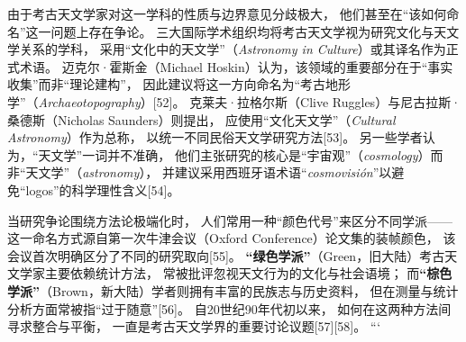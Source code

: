 \bigskip
由于考古天文学家对这一学科的性质与边界意见分歧极大，  
他们甚至在“该如何命名”这一问题上存在争论。  
三大国际学术组织均将考古天文学视为研究文化与天文学关系的学科，  
采用“文化中的天文学”（\textit{Astronomy in Culture}）或其译名作为正式术语。  
迈克尔·霍斯金（Michael Hoskin）认为，该领域的重要部分在于“事实收集”而非“理论建构”，  
因此建议将这一方向命名为“考古地形学”（\textit{Archaeotopography}）[52]。  
克莱夫·拉格尔斯（Clive Ruggles）与尼古拉斯·桑德斯（Nicholas Saunders）则提出，  
应使用“文化天文学”（\textit{Cultural Astronomy}）作为总称，  
以统一不同民俗天文学研究方法[53]。  
另一些学者认为，“天文学”一词并不准确，  
他们主张研究的核心是“宇宙观”（\textit{cosmology}）而非“天文学”（\textit{astronomy}），  
并建议采用西班牙语术语“\textit{cosmovisión}”以避免“logos”的科学理性含义[54]。

\bigskip
当研究争论围绕方法论极端化时，  
人们常用一种“颜色代号”来区分不同学派——  
这一命名方式源自第一次牛津会议（Oxford Conference）论文集的装帧颜色，  
该会议首次明确区分了不同的研究取向[55]。  
\textbf{“绿色学派”}（Green，旧大陆）考古天文学家主要依赖统计方法，  
常被批评忽视天文行为的文化与社会语境；  
而\textbf{“棕色学派”}（Brown，新大陆）学者则拥有丰富的民族志与历史资料，  
但在测量与统计分析方面常被指“过于随意”[56]。  
自20世纪90年代初以来，  
如何在这两种方法间寻求整合与平衡，  
一直是考古天文学界的重要讨论议题[57][58]。
```
